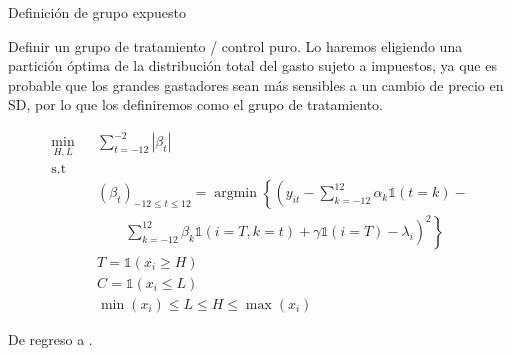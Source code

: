 \documentclass[8pt]{beamer}
\begin{document}
\begin{frame}[label=exposed_group]{Definición de grupo expuesto}

Definir un grupo de tratamiento / control puro. Lo haremos eligiendo una partición óptima de la distribución total del gasto sujeto a impuestos, ya que es probable que los grandes gastadores sean más sensibles a un cambio de precio en SD, por lo que los definiremos como el grupo de tratamiento.


\begin{eqnarray*}
\underset{H, L}{\min}& & \sum_{t=-12}^{-2}|\beta_{t}| \\
\text{s.t} & &\\
& & (\beta_t)_{-12\leq t\leq 12}=\operatorname{argmin}\left\lbrace\left(y_{it}-\sum_{k=-12}^{12}\alpha_{k}\mathds{1}(t=k)-\right.\right.\\
& & \quad\quad\left.\left.\sum_{k=-12}^{12}\beta_{k}\mathds{1}(i=T,k=t)+\gamma\mathds{1}(i=T)-\lambda_i\right)^2\right\rbrace\\
& & T=\mathds{1}(x_i\geq H) \\
& & C=\mathds{1}(x_i\leq L)\\
& & \min(x_i)\leq L\leq H \leq \max(x_i)
\end{eqnarray*}

De regreso a \hyperlink{did}{}.
\end{frame}
\end{document}
